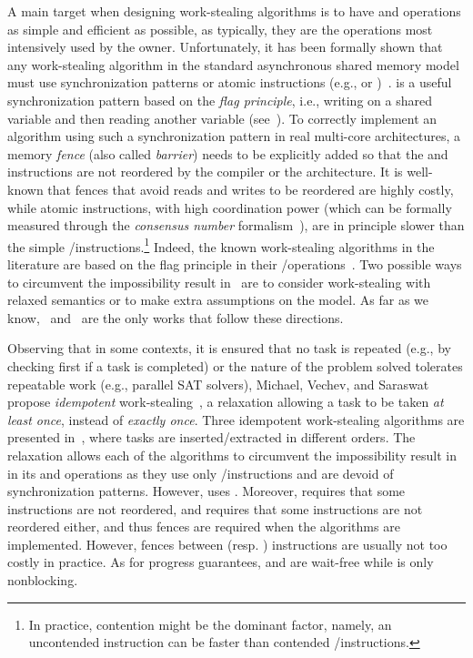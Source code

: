 A main target when designing work-stealing algorithms is to have \Put and \Take operations as simple and efficient as possible, as typically, they are the operations most intensively used by the owner. Unfortunately, it has been formally shown that any work-stealing algorithm in the standard asynchronous shared memory model must use \RAW synchronization patterns or atomic \RMW instructions (e.g., \CAS or \TAS)~\cite{DBLP_journals_jacm_AttiyaGHK09}. \RAW is a useful synchronization pattern based on the \emph{flag principle}, i.e., writing on a shared variable and then reading another variable (see~\cite {DBLP_books_daglib_0020056}). To correctly implement an algorithm using such a synchronization pattern in real multi-core architectures, a memory \emph{fence} (also called \emph{barrier}) needs to be explicitly added so that the \R and \W instructions are not reordered by the compiler or the architecture.  It is well-known that fences that avoid reads and writes to be reordered are highly costly, while atomic \RMW instructions, with high coordination power (which can be formally measured through the \emph{consensus number} formalism~\cite{DBLP_journals_toplas_Herlihy91}), are in principle slower than the simple \R/\W instructions.\footnote{In practice, contention might be the dominant factor, namely, an uncontended \RMW instruction can be faster than contended \R/\W instructions.} Indeed, the known work-stealing algorithms in the literature are based on the flag principle in their \Take/\Steal operations~\cite{circular.work.stealing, FLR98, non.blocking.work.stealing, 10.1145.571825.571876}.  Two possible ways to circumvent the impossibility result in~\cite{DBLP_journals_jacm_AttiyaGHK09} are to consider work-stealing with relaxed semantics or to make extra assumptions on the model.  As far as we know,~\cite{maged.vechev.2009} and~\cite{fencefreework} are the only works that follow these directions.

Observing that in some contexts, it is ensured that no task is repeated (e.g., by checking first if a task is completed) or the nature of the problem solved tolerates repeatable work (e.g., parallel SAT solvers), Michael, Vechev, and Saraswat propose \emph{idempotent} work-stealing~\cite{maged.vechev.2009}, a relaxation allowing a task to be taken \emph{at least once}, instead of \emph{exactly once}.  Three idempotent work-stealing algorithms are presented in~\cite{maged.vechev.2009}, where tasks are inserted/extracted in different orders.  The relaxation allows each of the algorithms to circumvent the impossibility result in~\cite{DBLP_journals_jacm_AttiyaGHK09} in its \Put and \Take operations as they use only \R/\W instructions and are devoid of \RAW synchronization patterns. However, \Steal uses \CAS. Moreover, \Put requires that some \W instructions are not reordered, and \Steal requires that some \R instructions are not reordered either, and thus fences are required when the algorithms are implemented. However, fences between \R (resp. \W) instructions are usually not too costly in practice. As for progress guarantees, \Put and \Take are wait-free while \Steal is only nonblocking.

